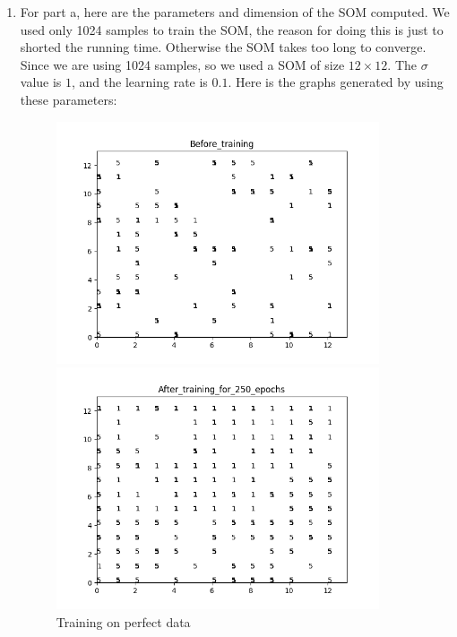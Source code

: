 \documentclass[11pt]{article}
\begin{document}
\begin{enumerate}
\begin{enumerate}
\item For part a, here are the parameters and dimension of the SOM computed. We used only 1024 samples to train the SOM, the reason for doing this is just to shorted the running time. Otherwise the SOM takes too long to converge. Since we are using 1024 samples, so we used a SOM of size $12 \times 12$. The $\sigma$ value is $1$, and the learning rate is $0.1$. Here is the graphs generated by using these parameters:\\
\begin{figure}[h!]
    \centering
    \begin{minipage}{0.45\textwidth}
    	\centering
        \includegraphics[width=0.9\textwidth]{Before_training}
        \caption{Training on perfect data}
    \end{minipage}\hfill
    \begin{minipage}{0.45\textwidth}
    	\centering
         \includegraphics[width=0.9\textwidth]{After_training_for_250_epochs}

\end{minipage}
\end{figure}
\end{enumerate}
\end{enumerate}
\end{document}
